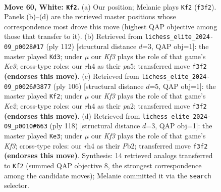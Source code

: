 \documentclass[11pt]{article}
\begin{document}
\clearpage

\begin{figure}[p]\centering
\begin{subfigure}{0.46\textwidth}\centering
\resizebox{\linewidth}{!}{%
\newchessgame
\chessboard[
  setfen={8/p7/2pp4/5k2/7r/5K2/8/8 w - - 0 60},
  showmover=false,
  pgfstyle=straightmove, color=movearrow, markmove={f3-f2}
]}
\caption{}
\end{subfigure}\hfill
\begin{subfigure}{0.46\textwidth}\centering
\resizebox{\linewidth}{!}{%
\newchessgame
\chessboard[
  setfen={8/1p6/5p2/p1k5/8/2K5/8/8 w - - 1 57},
  showmover=false,
  pgfstyle=straightmove, color=movearrow, markmove={c3-d3}
]}
\caption{}
\end{subfigure}
\\[4pt]
\begin{subfigure}{0.46\textwidth}\centering
\resizebox{\linewidth}{!}{%
\newchessgame
\chessboard[
  setfen={8/1p6/8/2P5/4k3/8/p3K3/8 w - - 2 54},
  showmover=false,
  pgfstyle=straightmove, color=movearrow, markmove={e2-f2}
]}
\caption{}
\end{subfigure}\hfill
\begin{subfigure}{0.46\textwidth}\centering
\resizebox{\linewidth}{!}{%
\newchessgame
\chessboard[
  setfen={8/6p1/p7/5k2/p7/5K2/1P6/8 w - - 4 60},
  showmover=false,
  pgfstyle=straightmove, color=movearrow, markmove={f3-e3}
]}
\caption{}
\end{subfigure}
\caption{\textbf{Move 60, White: \texttt{Kf2}.} (a) Our position; Melanie plays \texttt{Kf2} (\texttt{f3f2}). Panels (b)--(d) are the retrieved master positions whose correspondence most drove this move (highest QAP objective among those that transfer to it). (b) Retrieved from \texttt{lichess\_elite\_2024-09\_p0028\#17} (ply 112) [structural distance $d$=3, QAP obj=1]: the master played \texttt{Kd3}; under $\mu$ our \emph{Kf3} plays the role of that game's \emph{Kc3}; cross-type roles: our \emph{r}h4 as their \emph{p}a5; transferred move \texttt{f3f2} \textbf{(endorses this move)}. (c) Retrieved from \texttt{lichess\_elite\_2024-09\_p0026\#3877} (ply 106) [structural distance $d$=5, QAP obj=1]: the master played \texttt{Kf2}; under $\mu$ our \emph{Kf3} plays the role of that game's \emph{Ke2}; cross-type roles: our \emph{r}h4 as their \emph{p}a2; transferred move \texttt{f3f2} \textbf{(endorses this move)}. (d) Retrieved from \texttt{lichess\_elite\_2024-09\_p0010\#663} (ply 118) [structural distance $d$=3, QAP obj=1]: the master played \texttt{Ke3}; under $\mu$ our \emph{Kf3} plays the role of that game's \emph{Kf3}; cross-type roles: our \emph{r}h4 as their \emph{P}b2; transferred move \texttt{f3f2} \textbf{(endorses this move)}. Synthesis: 14 retrieved analogs transferred to \texttt{Kf2} (summed QAP objective 8, the strongest correspondence among the candidate moves); Melanie committed it via the \texttt{search} selector.}
\label{fig:thought-m118}
\end{figure}
\end{document}
